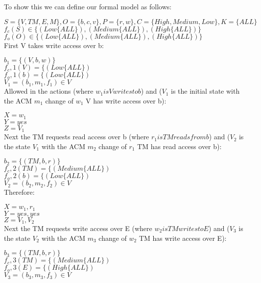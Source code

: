 \documentclass[journal,onecolumn]{IEEEtran}
\begin{document}
\begin{enumerate}
\begin{enumerate}
      To show this we can define our formal model as follows:

      $S = \{V, TM, E, M\}, O = \{b, c, v\}, P = \{r, w\}, C = \{High, Medium, Low\}, K = \{ALL\}$\\
      $f_c(S) \in \{(Low \{ALL\}), (Medium \{ALL\}), (High \{ALL\}) \}$\\
      $f_o(O) \in \{(Low \{ALL\}), (Medium \{ALL\}), (High \{ALL\}) \}$\\

      First V takes write access over b:

      $b_1=\{(V, b, w)\}$\\
      $f_c,1(V) = \{(Low \{ALL\})$\\
      $f_o,1(b) = \{(Low \{ALL\})$\\
      $V_1 = (b_1,m_1,f_1) \in V$\\

      Allowed in the actions (where $w_1 is V writes to b$) and ($V_1$ is the initial state with the ACM $m_1$ change of $w_1$ V has write access over b):

      $X = w_1$\\
      $Y = yes$\\
      $Z = V_1$\\

      Next the TM requests read access over b (where $r_1 is TM reads from b$) and ($V_2$ is the state $V_1$ with the ACM $m_2$ change of $r_1$ TM has read access over b):

      $b_2=\{(TM, b, r)\}$\\
      $f_c,2(TM) = \{(Medium \{ALL\})$\\
      $f_o,2(b) = \{(Low \{ALL\})$\\
      $V_2 = (b_2,m_2,f_2) \in V$\\

      Therefore:

      $X = w_1, r_1$\\
      $Y = yes, yes$\\
      $Z = V_1, V_2$\\

      Next the TM requests write access over E (where $w_2 is TM writes to E$) and ($V_3$ is the state $V_2$ with the ACM $m_3$ change of $w_2$ TM has write access over E):

      $b_3=\{(TM, b, r)\}$\\
      $f_c,3(TM) = \{(Medium \{ALL\})$\\
      $f_o,3(E) = \{(High \{ALL\})$\\
      $V_3 = (b_3,m_3,f_3) \in V$\\


\end{enumerate}
\end{enumerate}
\end{document}
